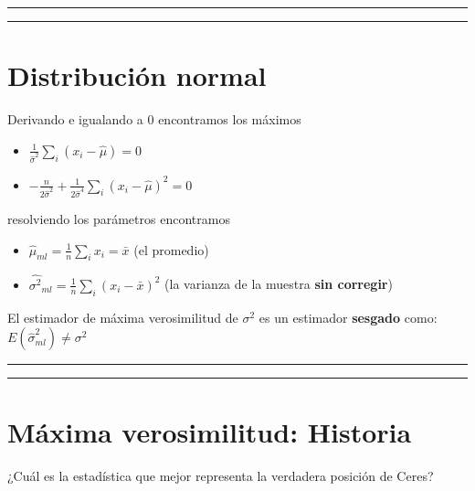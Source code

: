 \documentclass[
]{book}
\providecommand{\tightlist}{%
  \setlength{\itemsep}{0pt}\setlength{\parskip}{0pt}}
\begin{document}
\begin{center}\rule{0.5\linewidth}{0.5pt}\end{center}

\begin{center}\rule{0.5\linewidth}{0.5pt}\end{center}

\hypertarget{distribuciuxf3n-normal-12}{%
\section{Distribución normal}\label{distribuciuxf3n-normal-12}}

Derivando e igualando a \(0\) encontramos los máximos

\begin{itemize}
\tightlist
\item
  \(\frac{1}{\hat{\sigma}^2} \sum_i(x_i-\hat{\mu})=0\)
\item
  \(-\frac{n}{2 \hat{\sigma}^2}+\frac{1}{2\hat{\sigma}^4} \sum_i(x_i-\hat{\mu})^2 =0\)
\end{itemize}

resolviendo los parámetros encontramos

\begin{itemize}
\tightlist
\item
  \(\hat{\mu}_{ml}=\frac{1}{n}\sum_i x_i=\bar{x}\) (el promedio)
\item
  \(\hat{\sigma^2}_{ml}=\frac{1}{n}\sum_i(x_i-\bar{x})^2\) (la varianza de la muestra \textbf{sin corregir})
\end{itemize}

El estimador de máxima verosimilitud de \(\sigma^2\) es un estimador \textbf{sesgado} como: \(E(\hat{\sigma}^2_{ml})\neq \sigma^2\)

\begin{center}\rule{0.5\linewidth}{0.5pt}\end{center}

\begin{center}\rule{0.5\linewidth}{0.5pt}\end{center}

\hypertarget{muxe1xima-verosimilitud-historia}{%
\section{Máxima verosimilitud: Historia}\label{muxe1xima-verosimilitud-historia}}

¿Cuál es la estadística que mejor representa la verdadera posición de Ceres?
\end{document}
